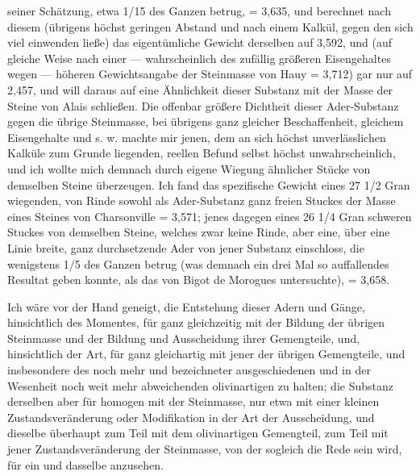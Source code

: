 \documentclass[a4paper, 11pt, oneside, german]{article}
\begin{document}
seiner Schätzung, etwa 1/15 des Ganzen betrug, = 3,635, und berechnet nach diesem (übrigens höchst geringen Abstand und nach einem Kalkül, gegen den sich viel einwenden ließe) das eigentümliche Gewicht derselben auf 3,592, und (auf gleiche Weise nach einer --- wahrscheinlich des zufällig größeren Eisengehaltes wegen --- höheren Gewichtsangabe der Steinmasse von Hauy = 3,712) gar nur auf 2,457, und will daraus auf eine Ähnlichkeit dieser Substanz mit der Masse der Steine von Alais schließen. Die offenbar größere Dichtheit dieser Ader-Substanz gegen die übrige Steinmasse, bei übrigens ganz gleicher Beschaffenheit, gleichem Eisengehalte und s. w. machte mir jenen, dem an sich höchst unverlässlichen Kalküle zum Grunde liegenden, reellen Befund selbst höchst unwahrscheinlich, und ich wollte mich demnach durch eigene Wiegung ähnlicher Stücke von demselben Steine überzeugen. Ich fand das spezifische Gewicht eines 27 1/2 Gran wiegenden, von Rinde sowohl als Ader-Substanz ganz freien Stuckes der Masse eines Steines von Charsonville = 3,571; jenes dagegen eines 26 1/4 Gran schweren Stuckes von demselben Steine, welches zwar keine Rinde, aber eine, über eine Linie breite, ganz durchsetzende Ader von jener Substanz einschloss, die wenigstens 1/5 des Ganzen betrug (was demnach ein drei Mal so auffallendes Resultat geben konnte, als das von Bigot de Morogues untersuchte), = 3,658.

Ich wäre vor der Hand geneigt, die Entstehung dieser Adern und Gänge, hinsichtlich des Momentes, für ganz gleichzeitig mit der Bildung der übrigen Steinmasse und der Bildung und Ausscheidung ihrer Gemengteile, und, hinsichtlich der Art, für ganz gleichartig mit jener der übrigen Gemengteile, und insbesondere des noch mehr und bezeichneter ausgeschiedenen und in der Wesenheit noch weit mehr abweichenden olivinartigen zu halten; die Substanz derselben aber für homogen mit der Steinmasse, nur etwa mit einer kleinen Zustandsveränderung oder Modifikation in der Art der Ausscheidung, und dieselbe überhaupt zum Teil mit dem olivinartigen Gemengteil, zum Teil mit jener Zustandsveränderung der Steinmasse, von der sogleich die Rede sein wird, für ein und dasselbe anzusehen.
\end{document}

